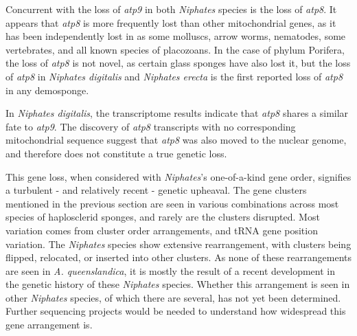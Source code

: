 \documentclass[../main.tex]{subfiles}
\begin{document}
Concurrent with the loss of \emph{atp9} in both \emph{Niphates} species is the loss of \emph{atp8}. It appears that \emph{atp8} is more frequently lost than other mitochondrial genes, as it has been independently lost in as some molluscs, arrow worms, nematodes, some vertebrates, and all known species of placozoans. In the case of phylum Porifera, the loss of \emph{atp8} is not novel, as certain glass sponges have also lost it, but the loss of \emph{atp8} in \emph{Niphates digitalis} and \emph{Niphates erecta} is the first reported loss of \emph{atp8} in any demosponge. 

In \emph{Niphates digitalis}, the transcriptome results indicate that \emph{atp8} shares a similar fate to \emph{atp9}. The discovery of \emph{atp8} transcripts with no corresponding mitochondrial sequence suggest that \emph{atp8} was also moved to the nuclear genome, and therefore does not constitute a true genetic loss. 

This gene loss, when considered with \emph{Niphates}'s one-of-a-kind gene order, signifies a turbulent - and relatively recent - genetic upheaval. The gene clusters mentioned in the previous section are seen in various combinations across most species of haplosclerid sponges, and rarely are the clusters disrupted. Most variation comes from cluster order arrangements, and tRNA gene position variation. The \emph{Niphates} species show extensive rearrangement, with clusters being flipped, relocated, or inserted into other clusters. As none of these rearrangements are seen in \emph{A. queenslandica}, it is mostly the result of a recent development in the genetic history of these \emph{Niphates} species. Whether this arrangement is seen in other \emph{Niphates} species, of which there are several, has not yet been determined. Further sequencing projects would be needed to understand how widespread this gene arrangement is. 
\end{document}

